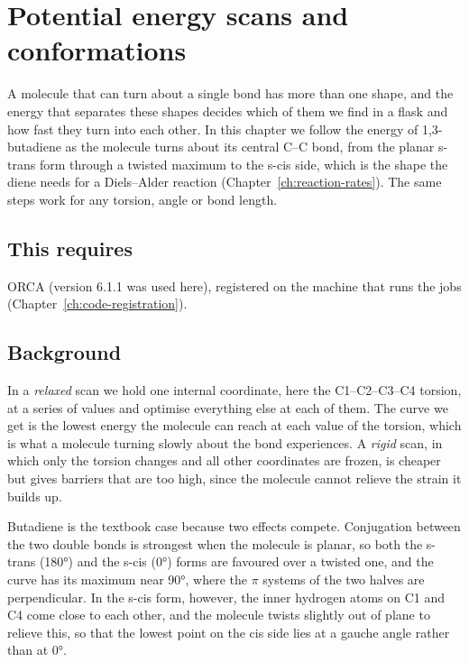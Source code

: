 \chapter{Potential energy scans and conformations}
\label{ch:scans}

A molecule that can turn about a single bond has more than one shape, and the energy that separates these shapes decides which of them we find in a flask and how fast they turn into each other. In this chapter we follow the energy of 1,3-butadiene as the molecule turns about its central C--C bond, from the planar s-trans form through a twisted maximum to the s-cis side, which is the shape the diene needs for a Diels--Alder reaction (Chapter~\ref{ch:reaction-rates}). The same steps work for any torsion, angle or bond length.

\section*{This requires}
ORCA (version 6.1.1 was used here), registered on the machine that runs the jobs (Chapter~\ref{ch:code-registration}).

\section{Background}
In a \emph{relaxed} scan we hold one internal coordinate, here the C1--C2--C3--C4 torsion, at a series of values and optimise everything else at each of them. The curve we get is the lowest energy the molecule can reach at each value of the torsion, which is what a molecule turning slowly about the bond experiences. A \emph{rigid} scan, in which only the torsion changes and all other coordinates are frozen, is cheaper but gives barriers that are too high, since the molecule cannot relieve the strain it builds up.

Butadiene is the textbook case because two effects compete. Conjugation between the two double bonds is strongest when the molecule is planar, so both the s-trans (180°) and the s-cis (0°) forms are favoured over a twisted one, and the curve has its maximum near 90°, where the $\pi$ systems of the two halves are perpendicular. In the s-cis form, however, the inner hydrogen atoms on C1 and C4 come close to each other, and the molecule twists slightly out of plane to relieve this, so that the lowest point on the cis side lies at a gauche angle rather than at 0°.

